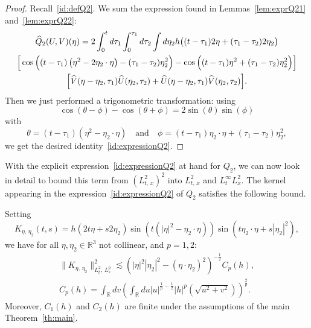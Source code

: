 \documentclass[AHL, Unicode, longabstracts,published]{cedram}
\newcommand{\R}{\mathbb{R}}
\let\oldhat\hat
\renewcommand*{\hat}[1]{\mathchoice{\widehat{#1}}{\widehat{#1}}{\oldhat{#1}}{\oldhat{#1}}}
\begin{document}
\begin{proof}
Recall~\eqref{id:defQ2}. We sum the expression found in Lemmas~\ref{lem:exprQ21} and~\ref{lem:exprQ22}:
\begin{multline*}
\hat Q_2(U,V) (\eta)= 2 \int_{0}^t d\tau_1 \int_{0}^{\tau_1} d\tau_2 \int d\eta_2 h\big((t-\tau_1)2\eta + (\tau_1 - \tau_2) 2\eta_2\big) \\
\Big[\cos\Big((t-\tau_1)\left(\eta^2-2\eta_2\cdot \eta\right)-(\tau_1-\tau_2)\eta_2^2 \Big) - \cos\Big((t-\tau_1) \eta^2 + (\tau_1 - \tau_2)\eta_2^2\Big)\Big] \\
\Big[\hat V(\eta-\eta_2,\tau_1) \hat U (\eta_2,\tau_2) + \hat U(\eta-\eta_2,\tau_1) \hat V (\eta_2,\tau_2) \Big].
\end{multline*}
Then we just performed a trigonometric transformation: using
\[
\cos(\theta - \phi) - \cos(\theta + \phi) = 2\sin(\theta) \sin (\phi)
\]
with
\[
\theta = (t-\tau_1)\left(\eta^2-\eta_2\cdot \eta\right)\quad \text{and}\quad
\phi = (t-\tau_1)\eta_2\cdot \eta + (\tau_1 - \tau_2)\eta_2^2,
\]
we get the desired identity~\eqref{id:expressionQ2}.
\end{proof}


With the explicit expression~\eqref{id:expressionQ2} at hand for $Q_2$, we can now look in detail to bound this term from $(L^2_{t,\,x})^2$ into $L^2_{t,\,x}$ and $L^{\infty}_tL^2_x$. The kernel appearing in the expression~\eqref{id:expressionQ2} of $Q_2$ satisfies the following bound.



\begin{lemm}\label{lem-normK}
Setting
\begin{equation} \label{id:defK}
K_{\eta,\,\eta_2}(t,s) = h\left(2t\eta + s 2\eta_2 \right)
\sin \left(t\left(|\eta|^2-\eta_2\cdot \eta\right)\right) \sin\left(t\eta_2\cdot \eta + s|\eta_2|^2\right),
\end{equation}
we have for all $\eta,\eta_2\in \R^3$ not collinear, and $p=1,2$:
\begin{multline*}
\big\|K_{\eta,\,\eta_2}\big\|_{L^2_t,\,L^p_s}^2 \lesssim \left(|\eta|^2|\eta_2|^2 - \left(\eta\cdot\eta_2\right)^2\right)^{-\frac 12}C_p(h), \\
 C_p(h)=\int_{\R} dv \left(\int_{\R} du |u|^{\frac1p-\frac 12}|h|^p\left(\sqrt{u^2+v^2}\right) \right)^{\frac 2p}.
\end{multline*}
Moreover, $C_1(h)$ and $C_2(h)$ are finite under the assumptions of the main Theorem~\ref{th:main}.
\end{lemm}
\end{document}

